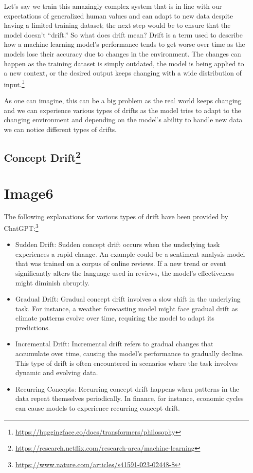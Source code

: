 \documentclass[
]{book}
\begin{document}
Let's say we train this amazingly complex system that is in line with our expectations of generalized human values and can adapt to new data despite having a limited training dataset; the next step would be to ensure that the model doesn't ``drift.'' So what does drift mean? Drift is a term used to describe how a machine learning model's performance tends to get worse over time as the models lose their accuracy due to changes in the environment. The changes can happen as the training dataset is simply outdated, the model is being applied to a new context, or the desired output keeps changing with a wide distribution of input.\footnote{\url{https://huggingface.co/docs/transformers/philosophy}}

As one can imagine, this can be a big problem as the real world keeps changing and we can experience various types of drifts as the model tries to adapt to the changing environment and depending on the model's ability to handle new data we can notice different types of drifts.

\hypertarget{concept-drift5}{%
\subsection[Concept Drift]{\texorpdfstring{Concept Drift\footnote{\url{https://research.netflix.com/research-area/machine-learning}}}{Concept Drift}}\label{concept-drift5}}

\hypertarget{image6}{%
\section{Image6}\label{image6}}

The following explanations for various types of drift have been provided by ChatGPT:\footnote{\url{https://www.nature.com/articles/s41591-023-02448-8}}

\begin{itemize}
\item
  Sudden Drift: Sudden concept drift occurs when the underlying task experiences a rapid change. An example could be a sentiment analysis model that was trained on a corpus of online reviews. If a new trend or event significantly alters the language used in reviews, the model's effectiveness might diminish abruptly.
\item
  Gradual Drift: Gradual concept drift involves a slow shift in the underlying task. For instance, a weather forecasting model might face gradual drift as climate patterns evolve over time, requiring the model to adapt its predictions.
\item
  Incremental Drift: Incremental drift refers to gradual changes that accumulate over time, causing the
  model's performance to gradually decline. This type of drift is often encountered in scenarios where the task involves dynamic and evolving data.
\item
  Recurring Concepts: Recurring concept drift happens when patterns in the data repeat themselves periodically. In finance, for instance, economic cycles can cause models to experience recurring concept drift.
\end{itemize}
\end{document}
